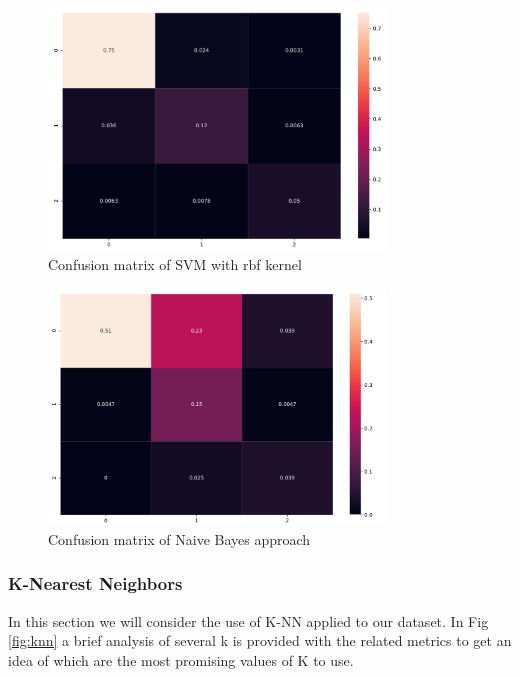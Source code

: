 \documentclass[a4paper,12pt]{article}
\begin{document}
\begin{figure}[H]
  \begin{center}
  \includegraphics[width=0.8\textwidth]{images/svm_rbf.png}
  \end{center}
  \caption{Confusion matrix of SVM with rbf kernel}
  \label{fig:confusion_svm}
\end{figure}

\begin{figure}[H]
  \begin{center}
  \includegraphics[width=0.8\textwidth]{images/confusion_naive.png}
  \end{center}
  \caption{Confusion matrix of Naive Bayes approach}
  \label{fig:confusion_bayes}
\end{figure}

\subsubsection{K-Nearest Neighbors}
In this section we will consider the use of K-NN applied to our dataset. In Fig \ref{fig:knn} a brief analysis of several k is provided with the related metrics to get an idea of which are the most promising values of K to use.
\end{document}

